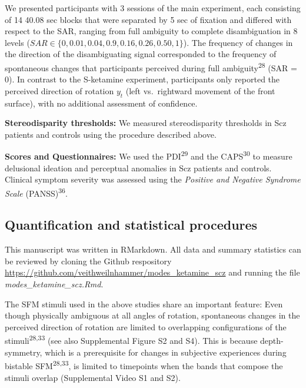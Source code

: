 \documentclass[
]{article}
\begin{document}
We presented participants with 3 sessions of the main experiment, each
consisting of 14 40.08 sec blocks that were separated by 5 sec of
fixation and differed with respect to the SAR, ranging from full
ambiguity to complete disambiguation in 8 levels
(\(SAR \in \{ 0, 0.01, 0.04, 0.9, 0.16, 0.26, 0.50, 1 \}\)). The
frequency of changes in the direction of the disambiguating signal
corresponded to the frequency of spontaneous changes that participants
perceived during full ambiguity\textsuperscript{28} (SAR = 0). In
contrast to the S-ketamine experiment, participants only reported the
perceived direction of rotation \(y_t\) (left vs.~rightward movement of
the front surface), with no additional assessment of confidence.

\textbf{Stereodisparity thresholds:} We measured stereodisparity
thresholds in Scz patients and controls using the procedure described
above.

\textbf{Scores and Questionnaires:} We used the PDI\textsuperscript{29}
and the CAPS\textsuperscript{30} to measure delusional ideation and
perceptual anomalies in Scz patients and controls. Clinical symptom
severity was assessed using the \emph{Positive and Negative Syndrome
Scale} (PANSS)\textsuperscript{36}.

\subsection{Quantification and statistical
procedures}\label{quantification-and-statistical-procedures}

This manuscript was written in RMarkdown. All data and summary
statistics can be reviewed by cloning the Github respository
\url{https://github.com/veithweilnhammer/modes_ketamine_scz} and running
the file \emph{modes\_ketamine\_scz.Rmd}.

The SFM stimuli used in the above studies share an important feature:
Even though physically ambiguous at all angles of rotation, spontaneous
changes in the perceived direction of rotation are limited to
overlapping configurations of the stimuli\textsuperscript{28,33} (see
also Supplemental Figure S2 and S4). This is because depth-symmetry,
which is a prerequisite for changes in subjective experiences during
bistable SFM\textsuperscript{28,33}, is limited to timepoints when the
bands that compose the stimuli overlap (Supplemental Video S1 and S2).
\end{document}
